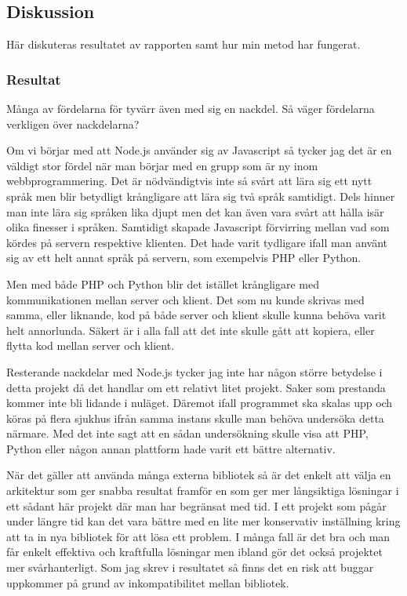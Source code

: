 \subsection{Diskussion}

Här diskuteras resultatet av rapporten samt hur min metod har fungerat.

\subsubsection{Resultat}

Många av fördelarna för tyvärr även med sig en nackdel. Så väger fördelarna verkligen över nackdelarna? 

Om vi börjar med att Node.js använder sig av Javascript så tycker jag det är en väldigt stor fördel när man börjar med en grupp som är ny inom webbprogrammering. Det är nödvändigtvis inte så svårt att lära sig ett nytt språk men blir betydligt krångligare att lära sig två språk samtidigt. Dels hinner man inte lära sig språken lika djupt men det kan även vara svårt att hålla isär olika finesser i språken. Samtidigt skapade Javascript förvirring mellan vad som kördes på servern respektive klienten. Det hade varit tydligare ifall man använt sig av ett helt annat språk på servern, som exempelvis PHP eller Python.

Men med både PHP och Python blir det istället krångligare med kommunikationen mellan server och klient. Det som nu kunde skrivas med samma, eller liknande, kod på både server och klient skulle kunna behöva varit helt annorlunda. Säkert är i alla fall att det inte skulle gått att kopiera, eller flytta kod mellan server och klient.

Resterande nackdelar med Node.js tycker jag inte har någon större betydelse i detta projekt då det handlar om ett relativt litet projekt. Saker som prestanda kommer inte bli lidande i nuläget. Däremot ifall programmet ska skalas upp och köras på flera sjukhus ifrån samma instans skulle man behöva undersöka detta närmare. Med det inte sagt att en sådan undersökning skulle visa att PHP, Python eller någon annan plattform hade varit ett bättre alternativ.

När det gäller att använda många externa bibliotek så är det enkelt att välja en arkitektur som ger snabba resultat framför en som ger mer långsiktiga lösningar i ett sådant här projekt där man har begränsat med tid. I ett projekt som pågår under längre tid kan det vara bättre med en lite mer konservativ inställning kring att ta in nya bibliotek för att lösa ett problem. I många fall är det bra och man får enkelt effektiva och kraftfulla lösningar men ibland gör det också projektet mer svårhanterligt. Som jag skrev i resultatet så finns det en risk att buggar uppkommer på grund av inkompatibilitet mellan bibliotek. 

